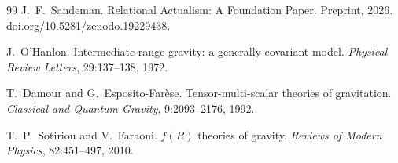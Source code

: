 \documentclass[11pt,a4paper]{article}
\theoremstyle{plain}
\theoremstyle{definition}
\theoremstyle{remark}
\begin{document}
\begin{thebibliography}{99}
J.~F.~Sandeman.
\newblock Relational Actualism: A Foundation Paper.
\newblock Preprint, 2026.
\newblock \href{https://doi.org/10.5281/zenodo.19229438}{doi.org/10.5281/zenodo.19229438}.

J.~O'Hanlon.
\newblock Intermediate-range gravity: a generally covariant model.
\newblock \textit{Physical Review Letters}, 29:137--138, 1972.

T.~Damour and G.~Esposito-Far\`{e}se.
\newblock Tensor-multi-scalar theories of gravitation.
\newblock \textit{Classical and Quantum Gravity}, 9:2093--2176, 1992.

T.~P.~Sotiriou and V.~Faraoni.
\newblock $f(R)$ theories of gravity.
\newblock \textit{Reviews of Modern Physics}, 82:451--497, 2010.

\end{thebibliography}
\end{document}
